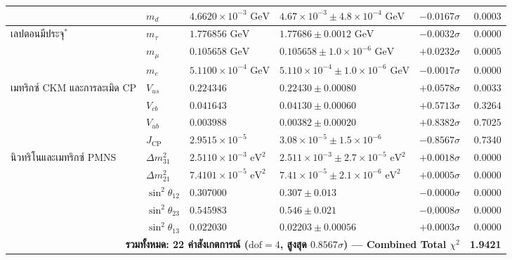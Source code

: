 \documentclass[11pt, a4paper]{article}
\begin{document}
{\begin{longtable}{p{2.7cm} l l p{4.1cm} r r}
 & $m_d$ & $4.6620 \times 10^{-3}\text{ GeV}$ & $4.67 \times 10^{-3} \pm 4.8 \times 10^{-4}\text{ GeV}$ & $-0.0167\sigma$ & $0.0003$ \\
\midrule
เลปตอนมีประจุ$^*$ & $m_\tau$ & $1.776856\text{ GeV}$ & $1.77686 \pm 0.0012\text{ GeV}$ & $-0.0032\sigma$ & $0.0000$ \\
 & $m_\mu$ & $0.105658\text{ GeV}$ & $0.105658 \pm 1.0 \times 10^{-6}\text{ GeV}$ & $+0.0232\sigma$ & $0.0005$ \\
 & $m_e$ & $5.1100 \times 10^{-4}\text{ GeV}$ & $5.110 \times 10^{-4} \pm 1.0 \times 10^{-6}\text{ GeV}$ & $-0.0017\sigma$ & $0.0000$ \\
\midrule
เมทริกซ์ CKM และการละเมิด CP & $V_{us}$ & $0.224346$ & $0.22430 \pm 0.00080$ & $+0.0578\sigma$ & $0.0033$ \\
 & $V_{cb}$ & $0.041643$ & $0.04130 \pm 0.00060$ & $+0.5713\sigma$ & $0.3264$ \\
 & $V_{ub}$ & $0.003988$ & $0.00382 \pm 0.00020$ & $+0.8382\sigma$ & $0.7025$ \\
 & $J_{\text{CP}}$ & $2.9515 \times 10^{-5}$ & $3.08 \times 10^{-5} \pm 1.5 \times 10^{-6}$ & $-0.8567\sigma$ & $0.7340$ \\
\midrule
นิวทริโนและเมทริกซ์ PMNS & $\Delta m_{31}^2$ & $2.5110 \times 10^{-3}\text{ eV}^2$ & $2.511 \times 10^{-3} \pm 2.7 \times 10^{-5}\text{ eV}^2$ & $+0.0018\sigma$ & $0.0000$ \\
 & $\Delta m_{21}^2$ & $7.4101 \times 10^{-5}\text{ eV}^2$ & $7.41 \times 10^{-5} \pm 2.1 \times 10^{-6}\text{ eV}^2$ & $+0.0005\sigma$ & $0.0000$ \\
 & $\sin^2\theta_{12}$ & $0.307000$ & $0.307 \pm 0.013$ & $-0.0000\sigma$ & $0.0000$ \\
 & $\sin^2\theta_{23}$ & $0.545983$ & $0.546 \pm 0.021$ & $-0.0008\sigma$ & $0.0000$ \\
 & $\sin^2\theta_{13}$ & $0.022030$ & $0.02203 \pm 0.00056$ & $+0.0003\sigma$ & $0.0000$ \\
\midrule
\multicolumn{5}{r}{\textbf{รวมทั้งหมด: 22 ค่าสังเกตการณ์ ($\text{dof} = 4$, สูงสุด $0.8567\sigma$) — Combined Total $\chi^2$}} & \textbf{1.9421} \\
\end{longtable}
}

\end{document}
